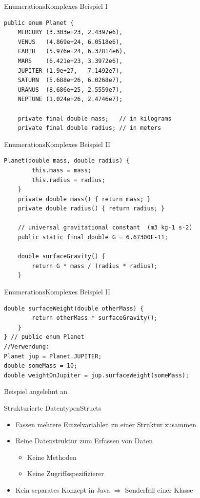 \begin{frame}[fragile]{Enumerations}{Komplexes Beispiel I}
\lstset{style=java}
\begin{lstlisting}
public enum Planet {
    MERCURY (3.303e+23, 2.4397e6),
    VENUS   (4.869e+24, 6.0518e6),
    EARTH   (5.976e+24, 6.37814e6),
    MARS    (6.421e+23, 3.3972e6),
    JUPITER (1.9e+27,   7.1492e7),
    SATURN  (5.688e+26, 6.0268e7),
    URANUS  (8.686e+25, 2.5559e7),
    NEPTUNE (1.024e+26, 2.4746e7);

    private final double mass;   // in kilograms
    private final double radius; // in meters
\end{lstlisting}
\end{frame}

\begin{frame}[fragile]{Enumerations}{Komplexes Beispiel II}
\lstset{style=java}
\begin{lstlisting}[firstnumber=13]
    Planet(double mass, double radius) {
        this.mass = mass;
        this.radius = radius;
    }
    private double mass() { return mass; }
    private double radius() { return radius; }

    // universal gravitational constant  (m3 kg-1 s-2)
    public static final double G = 6.67300E-11;

    double surfaceGravity() {
        return G * mass / (radius * radius);
    }
\end{lstlisting}
\end{frame}

\begin{frame}[fragile]{Enumerations}{Komplexes Beispiel II}
\lstset{style=java}
\begin{lstlisting}[firstnumber=26]
    double surfaceWeight(double otherMass) {
        return otherMass * surfaceGravity();
    }
} // public enum Planet
//Verwendung:
Planet jup = Planet.JUPITER;
double someMass = 10;
double weightOnJupiter = jup.surfaceWeight(someMass);
\end{lstlisting}

Beispiel angelehnt an \cite{orac:enum}
\end{frame}

\begin{frame}{Strukturierte Datentypen}{Structs}
    \begin{itemize}
        \item Fassen mehrere Einzelvariablen zu einer Struktur zusammen
        \item Reine Datenstruktur zum Erfassen von Daten
        \begin{itemize}
            \item Keine Methoden
            \item Keine Zugriffsspezifizierer
        \end{itemize}
        \item Kein separates Konzept in Java $\Rightarrow$ Sonderfall einer Klasse
    \end{itemize}
\end{frame}


